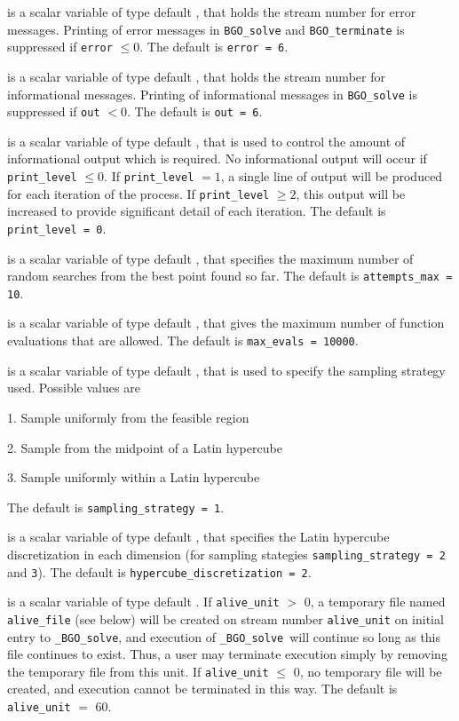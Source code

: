 \documentclass{galahad}
\newcommand{\packagename}{BGO}
\newcommand{\fullpackagename}{\libraryname\_\packagename}
\newcommand{\solver}{{\tt \fullpackagename\_solve}}
\begin{document}
\begin{description}

 is a scalar variable of type default \integer, that holds the
stream number for error messages. Printing of error messages in
{\tt \packagename\_solve} and {\tt \packagename\_terminate}
is suppressed if {\tt error} $\leq 0$.
The default is {\tt error = 6}.

 is a scalar variable of type default \integer, that holds the
stream number for informational messages. Printing of informational messages in
{\tt \packagename\_solve} is suppressed if {\tt out} $< 0$.
The default is {\tt out = 6}.

 is a scalar variable of type default \integer, that is used
to control the amount of informational output which is required. No
informational output will occur if {\tt print\_level} $\leq 0$. If
{\tt print\_level} $= 1$, a single line of output will be produced for each
iteration of the process. If {\tt print\_level} $\geq 2$, this output will be
increased to provide significant detail of each iteration.
The default is {\tt print\_level = 0}.

 is a scalar variable of type default \integer, that
specifies the maximum number of random searches from the best point
found so far.
The default is {\tt attempts\_max = 10}.

 is a scalar variable of type default \integer, that gives
the maximum number of function evaluations that are allowed.
The default is {\tt max\_evals = 10000}.

 is a scalar variable of type default \integer,
that is used to specify the sampling strategy used. Possible values are
\begin{description}
\item 1. Sample uniformly from the feasible region
\item 2. Sample from the midpoint of a Latin hypercube
\item 3. Sample uniformly within a Latin hypercube
\end{description}
The default is {\tt sampling\_strategy = 1}.

 is a scalar variable of type default \integer,
that specifies the Latin hypercube discretization in each dimension
(for sampling stategies {\tt sampling\_strategy = 2} and {\tt 3}).
The default is {\tt hyper\-cube\_discretization = 2}.

 is a scalar variable of type default \integer.
If {\tt alive\_unit} $>$ 0, a temporary file named {\tt alive\_file} (see below)
will be created on stream number {\tt alive\_unit} on initial entry to
\solver, and execution of \solver\ will continue so
long as this file continues to exist. Thus, a user may terminate execution
simply by removing the temporary file from this unit.
If {\tt alive\_unit} $\leq$ 0, no temporary file will be created, and
execution cannot be terminated in this way.
The default is {\tt alive\_unit} $=$ 60.


\end{description}
\end{document}
